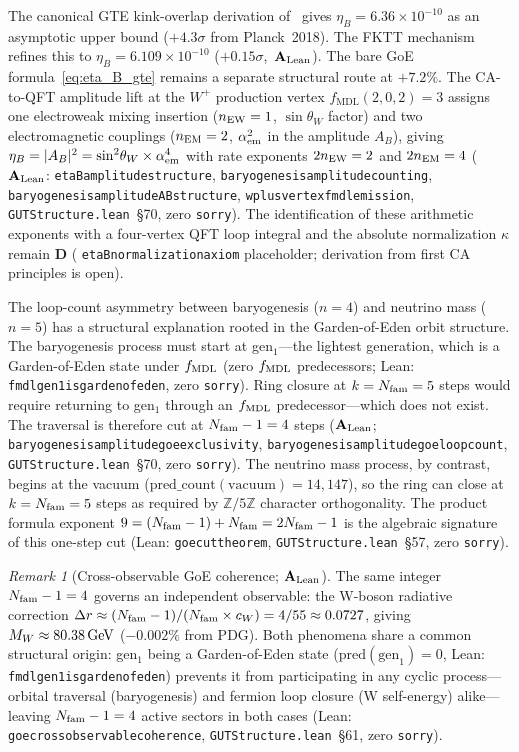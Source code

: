\documentclass[11pt]{article}
\theoremstyle{remark}
\newtheorem{remark}[theorem]{Remark}
\newcommand{\lean}[1]{%
  \penalty-100
  \begingroup\def\_{\textunderscore\allowbreak}\texttt{#1}\endgroup}
\newcommand{\sinwsq}{\sin^2\!\theta_W}
\newcommand{\CatAL}{\ensuremath{\textbf{A}_{\rm Lean}}}
\newcommand{\CatD}{\textbf{D}}
\begin{document}
The canonical GTE kink-overlap derivation of~\cite{SpivackGTECosmology} gives
$\eta_B = 6.36\times 10^{-10}$ as an asymptotic upper bound ($+4.3\sigma$ from Planck~2018).
The FKTT mechanism refines this to $\eta_B = 6.109\times10^{-10}$ ($+0.15\sigma$,~\CatAL).
The bare GoE formula~\eqref{eq:eta_B_gte} remains a separate structural route at $+7.2\%$.
The CA-to-QFT amplitude lift at the $W^+$ production vertex
$f_{\mathrm{MDL}}(2,0,2)=3$ assigns one electroweak mixing insertion
($n_{\rm EW}=1$, $\sin\theta_W$ factor) and two electromagnetic couplings
($n_{\rm EM}=2$, $\alpha_{\rm em}^2$ in the amplitude $A_B$), giving
$\eta_B = |A_B|^2 = \sinwsq \times \alpha_{\rm em}^4$ with rate exponents
$2n_{\rm EW}=2$ and $2n_{\rm EM}=4$
($\CatAL$:
\lean{eta\_B\_amplitude\_structure},
\lean{baryogenesis\_amplitude\_counting},
\lean{baryogenesis\_amplitude\_A\_B\_structure},
\lean{wplus\_vertex\_fmdl\_emission},
\texttt{GUTStructure.lean}~\S70, zero \texttt{sorry}).
The identification of these arithmetic exponents with a four-vertex QFT loop
integral and the absolute normalization $\kappa$ remain $\CatD$
(\lean{eta\_B\_normalization\_axiom} placeholder; derivation from first CA principles is open).

The loop-count asymmetry between baryogenesis ($n=4$) and neutrino mass ($n=5$)
has a structural explanation rooted in the Garden-of-Eden orbit structure.
The baryogenesis process must start at gen$_1$---the lightest generation, which is a
Garden-of-Eden state under $f_{\rm MDL}$ (zero $f_{\rm MDL}$ predecessors;
Lean: \lean{fmdl\_gen1\_is\_garden\_of\_eden}, zero \texttt{sorry}).
Ring closure at $k = N_{\rm fam} = 5$ steps would require returning to gen$_1$
through an $f_{\rm MDL}$ predecessor---which does not exist.
The traversal is therefore cut at $N_{\rm fam} - 1 = 4$ steps
($\CatAL$; \lean{baryogenesis\_amplitude\_goe\_exclusivity},
\lean{baryogenesis\_amplitude\_goe\_loop\_count},
\texttt{GUTStructure.lean}~\S70, zero \texttt{sorry}).
The neutrino mass process, by contrast, begins at the vacuum
($\text{pred\_count}(\text{vacuum}) = 14{,}147$), so the ring can close at
$k = N_{\rm fam} = 5$ steps as required by $\mathbb{Z}/5\mathbb{Z}$ character
orthogonality.
The product formula exponent $9 = (N_{\rm fam}-1) + N_{\rm fam} = 2N_{\rm fam}-1$
is the algebraic signature of this one-step cut
(Lean: \lean{goe\_cut\_theorem},
\texttt{GUTStructure.lean}~\S57, zero \texttt{sorry}).

\begin{remark}[Cross-observable GoE coherence; $\CatAL$]
The same integer $N_{\rm fam}-1 = 4$ governs an independent observable: the W-boson
radiative correction $\Delta r \approx (N_{\rm fam}-1)/(N_{\rm fam}\times c_W) = 4/55
\approx 0.0727$, giving $M_W \approx 80.38\,{\rm GeV}$ ($-0.002\%$ from PDG).  Both
phenomena share a common structural origin: gen$_1$ being a Garden-of-Eden state
($\mathrm{pred}(\mathrm{gen}_1) = 0$,
Lean: \lean{fmdl\_gen1\_is\_garden\_of\_eden}) prevents it from participating in any
cyclic process---orbital traversal (baryogenesis) and fermion loop closure
(W self-energy) alike---leaving $N_{\rm fam}-1 = 4$ active sectors in both cases
(Lean: \lean{goe\_cross\_observable\_coherence},
\texttt{GUTStructure.lean}~\S61, zero \texttt{sorry}).
\end{remark}
\end{document}
